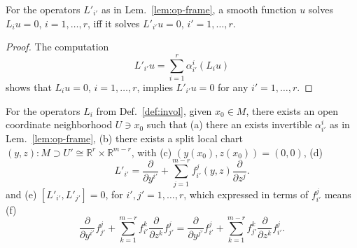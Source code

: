 \begin{lemma} \label{lem:eq-frame-equiv}
For the operators $L'_{i'}$ as in Lem.~\ref{lem:op-frame}, a smooth function $u$
solves $L_i u = 0$, $i=1,\ldots,r$, iff it solves $L'_{i'} u = 0$,
$i'=1,\ldots,r$.
\end{lemma}
\begin{proof}
The computation
\[
  L'_{i'} u = \sum_{i=1}^r \alpha_{i'}^i (L_i u)
\]
shows that $L_i u = 0$, $i=1,\ldots,r$, implies $L'_{i'} u = 0$ for any $i'=1,\ldots,r$.
\end{proof}

\begin{lemma} \label{lem:loc-init-split}
For the operators $L_i$ from Def.~\ref{def:invol}, given $x_0 \in M$, there exists
an open coordinate neighborhood $U\ni x_0$ such that (a) there an exists invertible
$\alpha_{i'}^i$ as in Lem.~\ref{lem:op-frame}, (b) there exists a split local
chart $(y,z)\colon M \supset U' \cong \mathbb{R}^r \times \mathbb{R}^{m-r}$, with
(c) $(y(x_0),z(x_0)) = (0,0)$, (d)
\[
  L'_{i'} = \frac{\partial}{\partial y^{i'}} + \sum_{j=1}^{m-r} f_{i'}^j(y,z) \frac{\partial}{\partial z^j} .
\]
and (e) $[L'_{i'}, L'_{j'}] = 0$, for $i',j'=1,\ldots,r$, which expressed in terms of $f_{i'}^j$ means (f)
\[
  \frac{\partial}{\partial y^{i'}} f_{j'}^j
    + \sum_{k=1}^{m-r} f_{i'}^k \frac{\partial}{\partial z^k} f_{j'}^j
  = \frac{\partial}{\partial y^{j'}} f_{i'}^j
    + \sum_{k=1}^{m-r} f_{j'}^k \frac{\partial}{\partial z^k} f_{i'}^j .
\]
\end{lemma}
